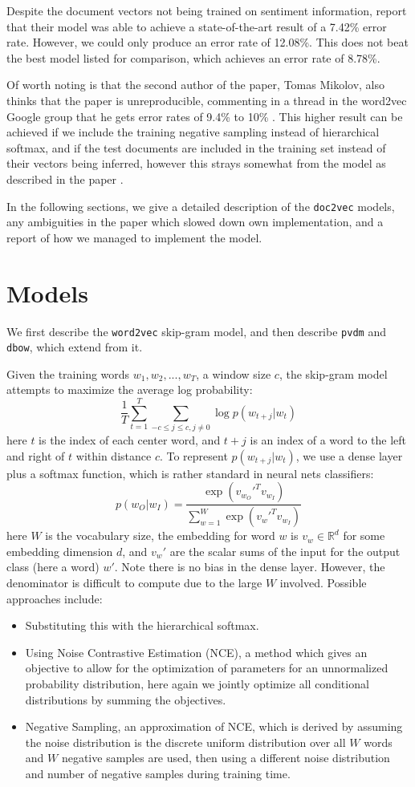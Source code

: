 \documentclass{article}
\begin{document}
Despite the document vectors not being trained on sentiment information, \cite{le_distributed_2014} report that their model was able to achieve a state-of-the-art result of a 7.42\% error rate. However, we could only produce an error rate of 12.08\%. This does not beat the best model listed for comparison, which achieves an error rate of 8.78\%.

Of worth noting is that the second author of the paper, Tomas Mikolov, also thinks that the paper is unreproducible, commenting in a thread in the word2vec Google group that he gets error rates of 9.4\% to 10\% \cite{mikolov_distributed_2014} . This higher result can be achieved if we include the training negative sampling instead of hierarchical softmax, and if the test documents are included in the training set instead of their vectors being inferred, however this strays somewhat from the model as described in the paper \cite{mohr_rare-technologies/gensim_2017}.

In the following sections, we give a detailed description of the \texttt{doc2vec} models, any ambiguities in the paper which slowed down own implementation, and a report of how we managed to implement the model.

\section{Models}
We first describe the \texttt{word2vec} skip-gram model, and then describe \texttt{pvdm} and \texttt{dbow}, which extend from it.

Given the training words $w_1,w_2,...,w_T$, a window size $c$, the skip-gram model attempts to maximize the average log probability:
    \[\frac{1}{T}\sum_{t=1}^T\sum_{-c\le j\le c,j\ne0} \log p(w_{t+j}|w_t)\]
here $t$ is the index of each center word, and $t+j$ is an index of a word to the left and right of $t$ within distance $c$. To represent $p(w_{t+j}|w_t)$, we use a dense layer plus a softmax function, which is rather standard in neural nets classifiers:
    \[p(w_O|w_I)=\frac{\exp(v_{w_O}'^T v_{w_I})}{\sum_{w=1}^W \exp(v_w'^T v_{w_I})}\]
here $W$ is the vocabulary size, the embedding for word $w$ is $v_w\in\mathbb{R}^d$ for some embedding dimension $d$, and $v_w'$ are the scalar sums of the input for the output class (here a word) $w'$. Note there is no bias in the dense layer. However, the denominator is difficult to compute due to the large $W$ involved. Possible approaches include:
\begin{itemize}
    \item Substituting this with the hierarchical softmax.
    \item Using Noise Contrastive Estimation (NCE), a method which gives an objective to allow for the optimization of parameters for an unnormalized probability distribution, here again we jointly optimize all conditional distributions by summing the objectives.
    \item Negative Sampling, an approximation of NCE, which is derived by assuming the noise distribution is the discrete uniform distribution over all $W$ words and $W$ negative samples are used, then using a different noise distribution and number of negative samples during training time.
\end{itemize}
\end{document}
